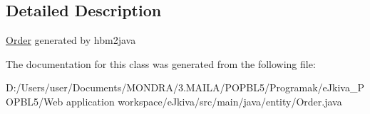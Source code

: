 \subsection{Detailed Description}
\mbox{\hyperlink{classentity_1_1_order}{Order}} generated by hbm2java 

The documentation for this class was generated from the following file\+:\begin{DoxyCompactItemize}
\item 
D\+:/\+Users/user/\+Documents/\+M\+O\+N\+D\+R\+A/3.\+M\+A\+I\+L\+A/\+P\+O\+P\+B\+L5/\+Programak/e\+Jkiva\+\_\+\+P\+O\+P\+B\+L5/\+Web application workspace/e\+Jkiva/src/main/java/entity/Order.\+java\end{DoxyCompactItemize}

